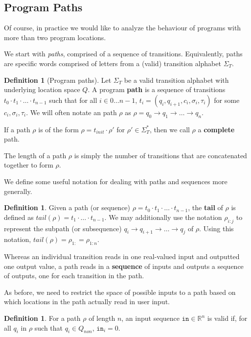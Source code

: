 \documentclass[12pt]{article}
\newcommand{\RR}{\mathbb{R}}
\theoremstyle{definition}
\newtheorem{defn}[thm]{Definition}
\begin{document}
\subsection{Program Paths}

Of course, in practice we would like to analyze the behaviour of programs with more than two program locations.

We start with \textit{paths}, comprised of a sequence of transitions. Equivalently, paths are specific words comprised of letters from a (valid) transition alphabet $\Sigma_T$. 

\begin{defn}[Program paths]
    Let $\Sigma_T$ be a valid transition alphabet with underlying location space $Q$. A program \textbf{path} is a sequence of transitions $t_0\cdot t_1\cdot \ldots\cdot t_{n-1}$ such that for all $i\in 0\ldots n-1$, $t_i = (q_i, q_{i+1}, c_i, \sigma_i, \tau_i)$ for some $c_i, \sigma_i, \tau_i$. We will often notate an path $\rho$ as $\rho = q_0\to q_1\to \ldots \to q_n$. 

    If a path $\rho$ is of the form $\rho = t_{init}\cdot \rho'$ for $\rho'\in \Sigma_T^*$, then we call $\rho$ a \textbf{complete} path. 
\end{defn}

The length of a path $\rho$ is simply the number of transitions that are concatenated together to form $\rho$. 

We define some useful notation for dealing with paths and sequences more generally. 

\begin{defn}
    Given a path (or sequence) $\rho = t_0\cdot t_1\cdot \ldots\cdot t_{n-1}$, the \textbf{tail} of $\rho$ is defined as $tail(\rho) = t_1\cdot \ldots\cdot t_{n-1}$. 
    We may additionally use the notation $\rho_{i:j}$ to represent the subpath (or subsequence) $q_i\to q_{i+1}\to \ldots \to q_j$ of $\rho$. Using this notation, $tail(\rho) = \rho_{1:} = \rho_{1:n}$.
\end{defn}

Whereas an individual transition reads in one real-valued input and outputted one output value, a path reads in a \textbf{sequence} of inputs and outputs a sequence of outputs, one for each transition in the path.

As before, we need to restrict the space of possible inputs to a path based on which locations in the path actually read in user input.
\begin{defn}
    For a path $\rho$ of length $n$, an input sequence $\texttt{in}\in \RR^n$ is valid if, for all $q_i$ in $\rho$ such that $q_i \in Q_{non}$, $\texttt{in}_i = 0$.  
\end{defn} 
\end{document}
